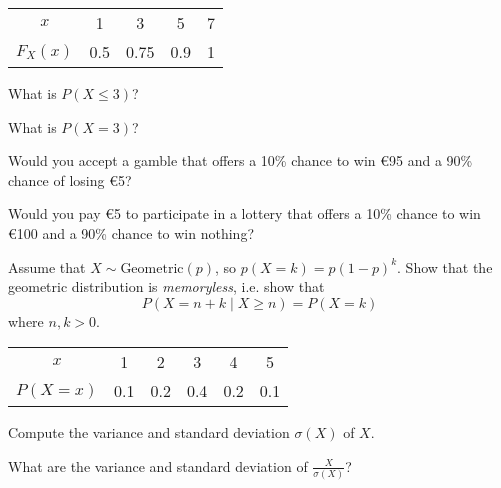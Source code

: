 \documentclass[10pt, a5paper]{scrartcl}
\begin{document}
\boardquestions

\begin{exercise}
  \begin{tabular}{c c c c c }
    \toprule
    $x$ 			& 1		& 3		& 5		& 7 \\
    $F_X(x)$	& 0.5	& 0.75	& 0.9	& 1 \\
    \bottomrule
  \end{tabular}
  
  \begin{subex}
  	What is $ P(X \leq 3) $?	
  \end{subex}
  
  \begin{subex}
    What is $ P(X = 3) $?	
  \end{subex}
\end{exercise}


\begin{exercise}[Expectations]
  
  \begin{subex}
    Would you accept a gamble that offers a 10\% chance to win \euro95 and a
    90\% chance of losing \euro5?
  \end{subex}
  
  \begin{subex}
    Would you pay \euro5 to participate in a lottery that offers a 10\% chance
    to win \euro100 and a 90\% chance to win nothing?
  \end{subex}
\end{exercise}


\begin{exercise}[Memorylessness]
  Assume that $ X \sim \text{Geometric}(p) $, so $p(X=k) = p(1-p)^k$. Show that
  the geometric distribution is \emph{memoryless}, i.e. show that
  \[
    P(X = n + k \mid X \geq n) = P(X = k)
  \]
  where $ n,k > 0 $.
\end{exercise}


\begin{exercise}[Variance]
  \begin{tabular}{c c c c c c}
    \toprule
    $ x $		& 1		&2		& 3		& 4		& 5	\\
    $P(X = x)$	& 0.1 	& 0.2	& 0.4	& 0.2	& 0.1 \\
    \bottomrule
  \end{tabular}
  
  \begin{subex}
    Compute the variance and standard deviation $ \sigma(X) $ of $ X $.
  \end{subex}

  \begin{subex}
    What are the variance and standard deviation of $ \frac{X}{\sigma(X)}$?
  \end{subex}
\end{exercise}


\vfill\creditsboardquestions
\end{document}
